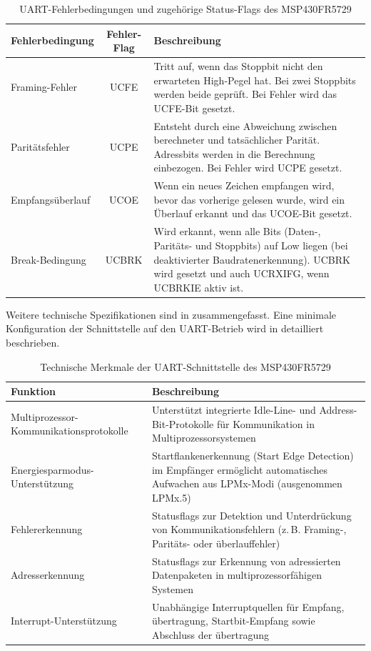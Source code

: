 \begin{table}[h!]
	\small
	\centering
	\begin{tabular}{|l|c|p{8.5cm}|}
		\hline
		\textbf{Fehlerbedingung} & \textbf{Fehler-Flag} & \textbf{Beschreibung} \\
		\hline
		Framing-Fehler & UCFE & Tritt auf, wenn das Stoppbit nicht den erwarteten High-Pegel hat. Bei zwei Stoppbits werden beide gepr\"uft. Bei Fehler wird das UCFE-Bit gesetzt. \\\hline
		Parit\"atsfehler & UCPE & Entsteht durch eine Abweichung zwischen berechneter und tats\"achlicher Parit\"at. Adressbits werden in die Berechnung einbezogen. Bei Fehler wird UCPE gesetzt. \\\hline
		Empfangs\"uberlauf & UCOE & Wenn ein neues Zeichen empfangen wird, bevor das vorherige gelesen wurde, wird ein \"Uberlauf erkannt und das UCOE-Bit gesetzt. \\\hline
		Break-Bedingung & UCBRK & Wird erkannt, wenn alle Bits (Daten-, Parit\"ats- und Stoppbits) auf Low liegen (bei deaktivierter Baudratenerkennung). UCBRK wird gesetzt und \ggf auch UCRXIFG, wenn UCBRKIE aktiv ist. \\\hline
	\end{tabular}
	\caption{UART-Fehlerbedingungen und zugeh\"orige Status-Flags des MSP430FR5729\\}
	\label{tab:uart_error_flags}
\end{table}

\newpage
Weitere technische Spezifikationen sind in  zusammengefasst. Eine minimale Konfiguration der Schnittstelle auf den UART-Betrieb wird in  detailliert beschrieben.

\begin{table}[h!]
	\small
	\centering
	\begin{tabular}{|p{6.5cm}|p{7cm}|}
		\hline
		\textbf{Funktion} & \textbf{Beschreibung} \\
		\hline
		Multiprozessor-Kommunikationsprotokolle & Unterst\"utzt integrierte Idle-Line- und Address-Bit-Protokolle f\"ur Kommunikation in Multiprozessorsystemen \\
		\hline
		Energiesparmodus-Unterst\"utzung & Startflankenerkennung (Start Edge Detection) im Empf\"anger erm\"oglicht automatisches Aufwachen aus LPMx-Modi (ausgenommen LPMx.5) \\
		\hline
		Fehlererkennung & Statusflags zur Detektion und Unterdr\"uckung von Kommunikationsfehlern (z.\,B. Framing-, Parit\"ats- oder \"uberlauffehler) \\
		\hline
		Adresserkennung & Statusflags zur Erkennung von adressierten Datenpaketen in multiprozessorf\"ahigen Systemen \\
		\hline
		Interrupt-Unterst\"utzung & Unabh\"angige Interruptquellen f\"ur Empfang, \"ubertragung, Startbit-Empfang sowie Abschluss der \"ubertragung \\
		\hline
	\end{tabular}
	\caption{Technische Merkmale der UART-Schnittstelle des MSP430FR5729\\}
	\label{tab:uart_features}
\end{table}

